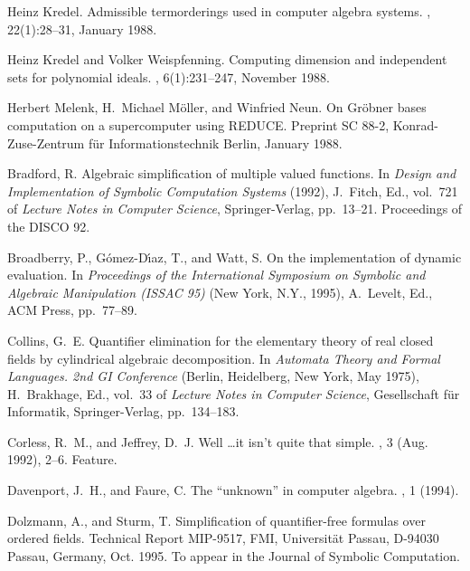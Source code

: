 \begin{thebibliography}{999}
Heinz Kredel.
\newblock Admissible termorderings used in computer algebra systems.
, 22(1):28--31, January 1988.

Heinz Kredel and Volker Weispfenning.
\newblock Computing dimension and independent sets for polynomial ideals.
, 6(1):231--247, November 1988.

Herbert Melenk, H.~Michael M{\"o}ller, and Winfried Neun.
\newblock On {G}r{\"o}bner bases computation on a supercomputer using {REDUCE}.
\newblock Preprint SC 88-2, Konrad-Zuse-Zentrum f{\"u}r Informationstechnik
  Berlin, January 1988.


{Bradford, R.}
\newblock Algebraic simplification of multiple valued functions.
\newblock In {\em Design and Implementation of Symbolic Computation Systems\/}
  (1992), J.~Fitch, Ed., vol.~721 of {\em Lecture Notes in Computer Science},
  Springer-Verlag, pp.~13--21.
\newblock Proceedings of the DISCO 92.

{Broadberry, P., G\'omez-D\'{\i}az, T., and Watt, S.}
\newblock On the implementation of dynamic evaluation.
\newblock In {\em Proceedings of the International Symposium on Symbolic and
  Algebraic Manipulation (ISSAC 95)\/} (New York, N.Y., 1995), A.~Levelt, Ed.,
  ACM Press, pp.~77--89.

{Collins, G.~E.}
\newblock Quantifier elimination for the elementary theory of real closed
  fields by cylindrical algebraic decomposition.
\newblock In {\em Automata Theory and Formal Languages. 2nd GI Conference\/}
  (Berlin, Heidelberg, New York, May 1975), H.~Brakhage, Ed., vol.~33 of {\em
  Lecture Notes in Computer Science}, Gesellschaft f\"ur Informatik,
  Springer-Verlag, pp.~134--183.

{Corless, R.~M., and Jeffrey, D.~J.}
\newblock Well \dots it isn't quite that simple.
, 3 (Aug. 1992), 2--6.
\newblock Feature.

{Davenport, J.~H., and Faure, C.}
\newblock The ``unknown'' in computer algebra.
, 1 (1994).

{Dolzmann, A., and Sturm, T.}
\newblock Simplification of quan\-ti\-fier-free formulas over ordered fields.
\newblock Technical Report MIP-9517, FMI, Universit\"at Passau, D-94030 Passau,
  Germany, Oct. 1995.
\newblock To appear in the Journal of Symbolic Computation.


\end{thebibliography}
